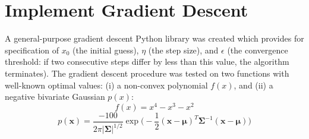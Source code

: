 \documentclass[10pt]{article}
\begin{document}
 



\section{Implement Gradient Descent}
A general-purpose gradient descent Python library was created which provides for specification of $x_0$ (the initial guess), $\eta$ (the step size), and $\epsilon$ (the convergence threshold: if two consecutive steps differ by less than this value, the algorithm terminates).  The gradient descent procedure was tested on two functions with well-known optimal values: (i)  a non-convex polynomial $f(x)$, and (ii) a negative bivariate Gaussian $p(x)$:
$$f(x) = x^4 - x^3 -x^2$$
$$p(\mathbf{x}) = \frac{-100}{2\pi|\mathbf{\Sigma}|^{1/2}}\exp{\bigg(-\frac{1}{2} (\mathbf{x} - \boldsymbol{\mu})^T\mathbf{\Sigma}^{-1} (\mathbf{x} - \boldsymbol{\mu}) \bigg)}$$
\end{document}
